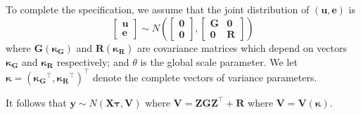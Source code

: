 \documentclass{sydneythesis}
\begin{document}
To complete the
specification, we assume that the joint distribution of \((\boldsymbol{u}, \boldsymbol{e})\) is
\[ \begin{bmatrix}
\boldsymbol{u} \\
\boldsymbol{e} 
\end{bmatrix}
\sim N \left( 
\begin{bmatrix}
\boldsymbol{0} \\
\boldsymbol{0} 
\end{bmatrix}, 
\begin{bmatrix}
\boldsymbol{G} & \boldsymbol{0} \\
\boldsymbol{0} & \boldsymbol{R} 
\end{bmatrix}
\right)
\]
where \(\boldsymbol{G}(\boldsymbol{\kappa_G})\) and \(\boldsymbol{R}(\boldsymbol{\kappa_R})\) are covariance matrices which depend on vectors \(\boldsymbol{\kappa_G}\) and \(\boldsymbol{\kappa_R}\) respectively; and \(\theta\) is the global scale parameter.
We let \(\boldsymbol{\kappa} = (\boldsymbol{\kappa_G}^\top, \boldsymbol{\kappa_R}^\top)^\top\) denote the complete vectors of variance parameters.

It follows that \(\boldsymbol{y} \sim N(\boldsymbol{X\tau}, \boldsymbol{V})\) where \(\boldsymbol{V} = \boldsymbol{ZGZ}^\top + \boldsymbol{R}\) where \(\boldsymbol{V}=\boldsymbol{V}(\boldsymbol{\kappa})\).

\printbibliography[heading=bibintoc]
\end{document}

